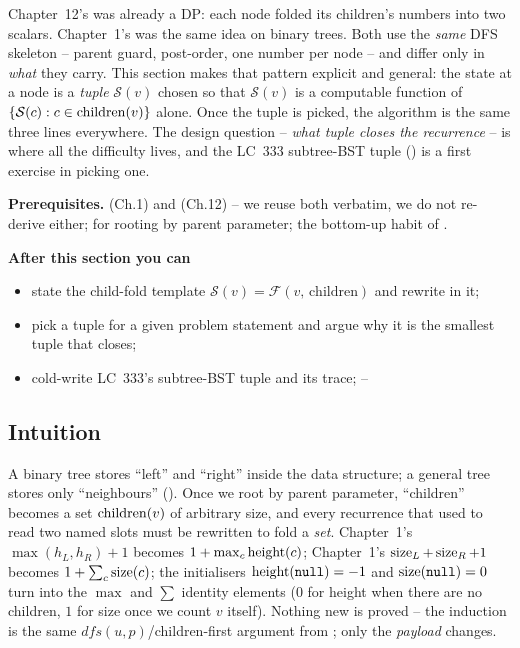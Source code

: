 \begin{topicintro}
Chapter~12's  was already a DP: each node folded its
children's numbers into two scalars. Chapter~1's 
was the same idea on binary trees. Both use the \emph{same} DFS skeleton --
parent guard, post-order, one number per node -- and differ only in
\emph{what} they carry. This section makes that pattern explicit and
general: the state at a node is a \emph{tuple} $\mathcal S(v)$ chosen so that
$\mathcal S(v)$ is a computable function of $\{\mathcal S(c):c\in\operatorname{children}(v)\}$
alone. Once the tuple is picked, the algorithm is the same three lines
everywhere. The design question -- \emph{what tuple closes the recurrence} --
is where all the difficulty lives, and the LC~333 subtree-BST tuple
() is a first exercise in picking one.

\textbf{Prerequisites.}  (Ch.1) and
 (Ch.12) -- we reuse both verbatim, we do not re-derive
either;  for rooting by parent parameter; the bottom-up habit of
.

\textbf{After this section you can}
\begin{itemize}[nosep]
  \item state the child-fold template $\mathcal S(v)=\mathcal F(v,\,\text{children})$
        and rewrite  in it; \hfill{}
  \item pick a tuple for a given problem statement and argue why it is
        the smallest tuple that closes; \hfill{}
  \item cold-write LC~333's subtree-BST tuple and its trace; \hfill{}--
\end{itemize}
\end{topicintro}

\subsection{Intuition}

A binary tree stores ``left'' and ``right'' inside the data structure; a
general tree stores only ``neighbours'' (). Once we root by parent
parameter, ``children'' becomes a set $\operatorname{children}(v)$ of arbitrary size, and
every recurrence that used to read two named slots must be rewritten to fold
a \emph{set}. Chapter~1's $\max(h_L,h_R)+1$ becomes $1 + \max_{c}\operatorname{height}(c)$;
Chapter~1's $\operatorname{size}_L+\operatorname{size}_R+1$ becomes $1 + \sum_c\operatorname{size}(c)$; the initialisers
$\operatorname{height}(\texttt{null})=-1$ and $\operatorname{size}(\texttt{null})=0$ turn into the $\max$ and $\sum$ identity
elements ($0$ for height when there are no children, $1$ for size once we
count $v$ itself). Nothing new is proved -- the induction is the same
$\mathit{dfs}(u,p)$/children-first argument from ;
only the \emph{payload} changes.

